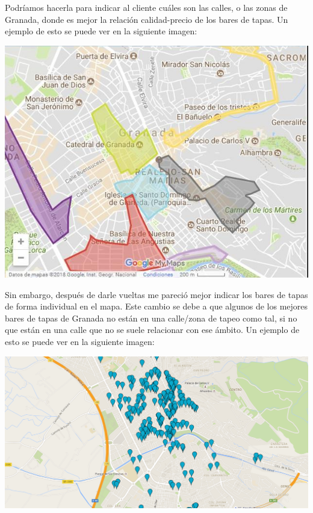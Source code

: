 \documentclass[a4paper,11pt]{article}
\begin{document}
\vspace{5 mm}

Podríamos hacerla para indicar al cliente cuáles son las calles, o las zonas de Granada, donde es mejor la relación calidad-precio de los bares de tapas. Un ejemplo de esto se puede ver en la siguiente imagen:

\vspace{5 mm}

\centering
{\includegraphics[width=1\textwidth]{imagenes/zonas.png}\par}
\raggedright
\justify

\newpage

Sin embargo, después de darle vueltas me pareció mejor indicar los bares de tapas de forma individual en el mapa. Este cambio se debe a que algunos de los mejores bares de tapas de Granada no están en una calle/zona de tapeo como tal, si no que están en una calle que no se suele relacionar con ese ámbito. Un ejemplo de esto se puede ver en la siguiente imagen:

\vspace{5 mm}

\centering
{\includegraphics[width=1\textwidth]{imagenes/sitios.png}\par}
\raggedright
\justify
\end{document}
